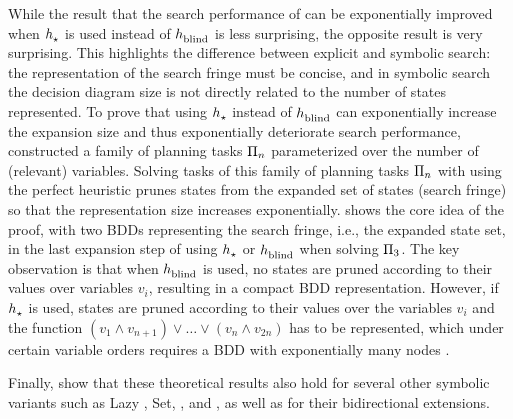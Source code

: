 While the result that the search performance of \bddastar{} can be exponentially improved when $h_\text{\scriptsize{\ensuremath{\star}}}^\text{\scriptsize{}}$ is used instead of $h_\text{\scriptsize{blind}}^\text{\scriptsize{}}$ is less surprising, the opposite result is very surprising.
This highlights the difference between explicit and symbolic search: the representation of the search fringe must be concise, and in symbolic search the decision diagram size is not directly related to the number of states represented.
To prove that using $h_\text{\scriptsize{\ensuremath{\star}}}^\text{\scriptsize{}}$ instead of $h_\text{\scriptsize{blind}}^\text{\scriptsize{}}$ can exponentially increase the expansion size and thus exponentially deteriorate search performance, \textcite{speck-et-al-icaps2020} constructed a family of planning tasks $\Pi_n$ parameterized over the number of (relevant) variables.
Solving tasks of this family of planning tasks $\Pi_n$ with \bddastar{} using the perfect heuristic prunes states from the expanded set of states (search fringe) so that the representation size increases exponentially.
 shows the core idea of the proof, with two BDDs representing the search fringe, i.e., the expanded state set, in the last expansion step of \bddastar{} using $h_\text{\scriptsize{\ensuremath{\star}}}^\text{\scriptsize{}}$ or $h_\text{\scriptsize{blind}}^\text{\scriptsize{}}$ when solving $\Pi_3$.
The key observation is that when $h_\text{\scriptsize{blind}}^\text{\scriptsize{}}$ is used, no states are pruned according to their values over variables $v_i$, resulting in a compact BDD representation.
However, if $h_\text{\scriptsize{\ensuremath{\star}}}^\text{\scriptsize{}}$ is used, states are pruned according to their values over the variables $v_i$ and the function $(v_1 \land v_{n+1}) \lor \dots \lor (v_{n} \land v_{2n})$ has to be represented, which under certain variable orders requires a BDD with exponentially many nodes \autocite{kissmann-phd2012}.

Finally, \textcite{speck-et-al-icaps2020} show that these theoretical results also hold for several other symbolic \astar{} variants such as Lazy \bddastar{}, Set\astar{}, \addastar{}, and \evmddastar{}, as well as for their bidirectional extensions.

